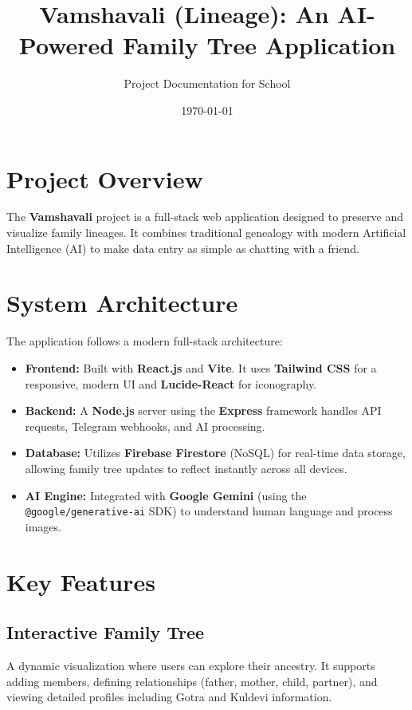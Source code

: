 \documentclass[11pt,a4paper]{article}
\title{Vamshavali (Lineage): An AI-Powered Family Tree Application}
\author{Project Documentation for School}
\date{\today}
\begin{document}
\maketitle

\section{Project Overview}
The \textbf{Vamshavali} project is a full-stack web application designed to preserve and visualize family lineages. It combines traditional genealogy with modern Artificial Intelligence (AI) to make data entry as simple as chatting with a friend.

\section{System Architecture}
The application follows a modern full-stack architecture:
\begin{itemize}
    \item \textbf{Frontend:} Built with \textbf{React.js} and \textbf{Vite}. It uses \textbf{Tailwind CSS} for a responsive, modern UI and \textbf{Lucide-React} for iconography.
    \item \textbf{Backend:} A \textbf{Node.js} server using the \textbf{Express} framework handles API requests, Telegram webhooks, and AI processing.
    \item \textbf{Database:} Utilizes \textbf{Firebase Firestore} (NoSQL) for real-time data storage, allowing family tree updates to reflect instantly across all devices.
    \item \textbf{AI Engine:} Integrated with \textbf{Google Gemini} (using the \texttt{@google/generative-ai} SDK) to understand human language and process images.
\end{itemize}

\section{Key Features}

\subsection{Interactive Family Tree}
A dynamic visualization where users can explore their ancestry. It supports adding members, defining relationships (father, mother, child, partner), and viewing detailed profiles including Gotra and Kuldevi information.
\end{document}
